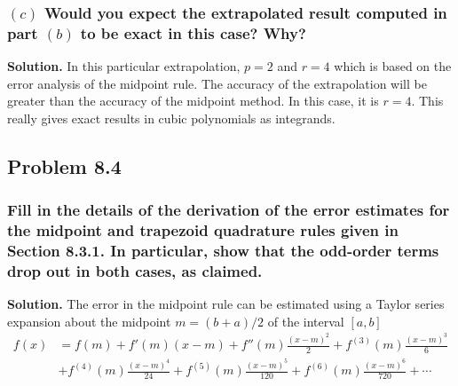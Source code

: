 \subsubsection*{$(c)$ Would you expect the extrapolated result computed in part $(b)$ to be exact in this case? Why?}
\textbf{Solution.} In this particular extrapolation, $p=2$ and $r=4$ which is based on the error analysis of the midpoint rule. The accuracy of the extrapolation will be greater than the accuracy of the midpoint method. In this case, it is $r=4$. This really gives exact results in cubic polynomials as integrands.

\subsection{Problem 8.4}
\subsubsection*{Fill in the details of the derivation of the error estimates for the midpoint and trapezoid quadrature rules given in Section 8.3.1. In par­ticular, show that the odd-order terms drop out in both cases, as claimed.}

\textbf{Solution.} The error in the midpoint rule can be estimated using a Taylor series expansion about the midpoint $m = (b+a)/2$ of the interval $[a,b]$
\begin{align}
f(x) &= f(m) + f'(m)(x-m) + f''(m)\frac{(x-m)^2}{2} + f^{(3)}(m)\frac{(x-m)^3}{6}\\
&+ f^{(4)}(m)\frac{(x-m)^4}{24} + f^{(5)}(m)\frac{(x-m)^5}{120} + f^{(6)}(m)\frac{(x-m)^6}{720} + \cdots
\end{align}

